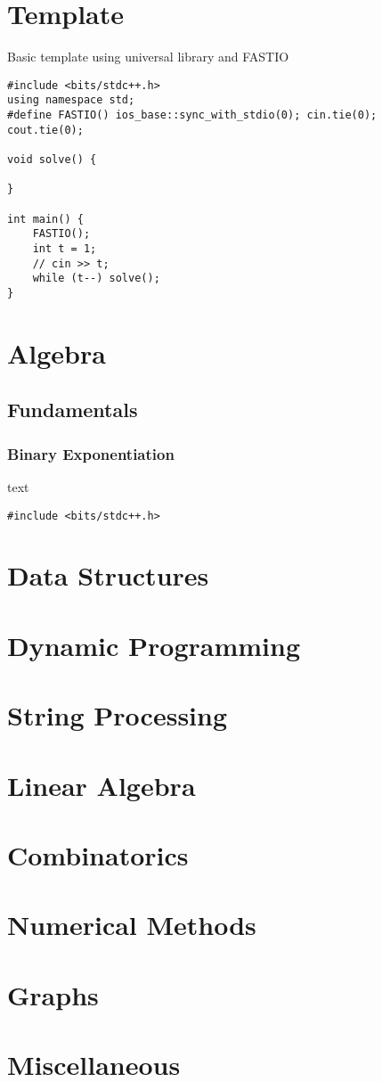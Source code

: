 \section{Template}
Basic template using universal library and FASTIO

\begin{lstlisting}
#include <bits/stdc++.h>
using namespace std;
#define FASTIO() ios_base::sync_with_stdio(0); cin.tie(0); cout.tie(0);

void solve() {
    
}
 
int main() {
    FASTIO();
    int t = 1;
    // cin >> t;
    while (t--) solve();
}   
\end{lstlisting}

\section{Algebra}
\subsection{Fundamentals}
\subsubsection{Binary Exponentiation}
text

\begin{lstlisting}
#include <bits/stdc++.h>
\end{lstlisting}

\section{Data Structures}
\section{Dynamic Programming}
\section{String Processing}
\section{Linear Algebra}
\section{Combinatorics}
\section{Numerical Methods}
\section{Graphs}
\section{Miscellaneous}
